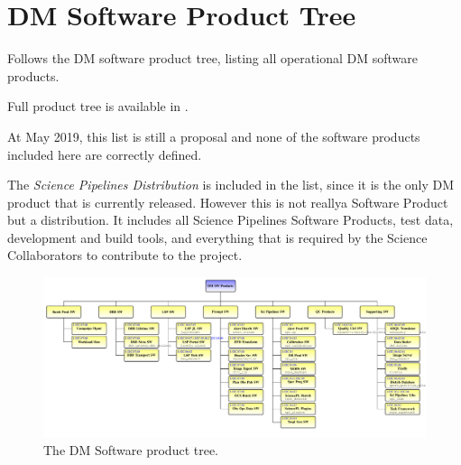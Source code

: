 \newpage
\section{DM Software Product Tree}\label{sec:swptree}

Follows the \gls{DM} software product tree, listing all operational \gls{DM} software products.

Full product tree is available in .

At May 2019, this list is still a proposal and none of the software products included here are correctly defined.

The \textit{Science Pipelines Distribution} is included in the list, since it is the only DM product that is currently released.
However this is not reallya Software Product but a distribution.
It includes all Science Pipelines Software Products, test data, development and build tools, and everything that is required by the Science Collaborators to contribute to the project.


\begin{figure}
\begin{center}
 \includegraphics[width=1.1\textwidth]{ProductTreeLand}

 \caption{The \gls{DM} Software product tree.}
 \label{fig:doctree}

\end{center}
\end{figure}

